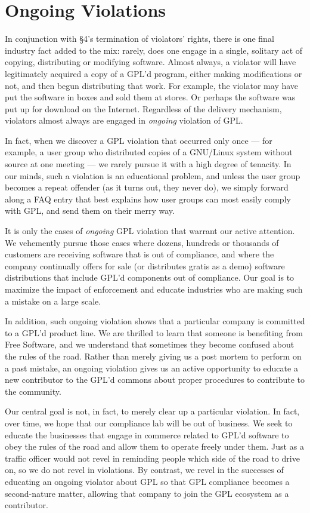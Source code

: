 {\section{Ongoing Violations}

In conjunction with \S 4's termination of violators' rights, there is
one final industry fact added to the mix: rarely, does one engage in a
single, solitary act of copying, distributing or modifying software.
Almost always, a violator will have legitimately acquired a copy of a
GPL'd program, either making modifications or not, and then begun
distributing that work. For example, the violator may have put the
software in boxes and sold them at stores. Or perhaps the software
was put up for download on the Internet. Regardless of the delivery
mechanism, violators almost always are engaged in {\em ongoing\/}
violation of GPL\@.

In fact, when we discover a GPL violation that occurred only once --- for
example, a user group who distributed copies of a GNU/Linux system without
source at one meeting --- we rarely pursue it with a high degree of
tenacity. In our minds, such a violation is an educational problem, and
unless the user group becomes a repeat offender (as it turns out, they
never do), we simply forward along a FAQ entry that best explains how user
groups can most easily comply with GPL, and send them on their merry way.

It is only the cases of {\em ongoing\/} GPL violation that warrant our
active attention. We vehemently pursue those cases where dozens, hundreds
or thousands of customers are receiving software that is out of
compliance, and where the company continually offers for sale (or
distributes gratis as a demo) software distributions that include GPL'd
components out of compliance. Our goal is to maximize the impact of
enforcement and educate industries who are making such a mistake on a
large scale.

In addition, such ongoing violation shows that a particular company is
committed to a GPL'd product line. We are thrilled to learn that someone
is benefiting from Free Software, and we understand that sometimes they
become confused about the rules of the road. Rather than merely
giving us a post mortem to perform on a past mistake, an ongoing violation
gives us an active opportunity to educate a new contributor to the GPL'd
commons about proper procedures to contribute to the community.

Our central goal is not, in fact, to merely clear up a particular violation.
In fact, over time, we hope that our compliance lab will be out of
business. We seek to educate the businesses that engage in commerce
related to GPL'd software to obey the rules of the road and allow them to
operate freely under them. Just as a traffic officer would not revel in
reminding people which side of the road to drive on, so we do not revel in
violations. By contrast, we revel in the successes of educating an
ongoing violator about GPL so that GPL compliance becomes a second-nature
matter, allowing that company to join the GPL ecosystem as a contributor.

}
